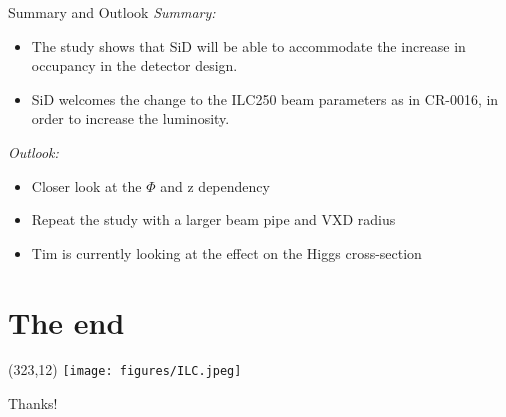\documentclass[xcolor={dvipsnames}]{beamer}
\newcommand{\ilclogo}{
  \setlength{\TPHorizModule}{1pt}
  \setlength{\TPVertModule}{1pt}
  \begin{textblock}{1}(323,12)
   \texttt{[image: figures/ILC.jpeg]}
  \end{textblock}
}
\begin{document}
\begin{frame}{Summary and Outlook}
 \textit{Summary:}
 \begin{itemize}
  \item The study shows that SiD will be able to accommodate the increase in occupancy in the detector design.
  \item \alert{SiD welcomes the change to the ILC250 beam parameters as in CR-0016, in order to increase the luminosity.}
 \end{itemize}
 \vspace*{0.5cm}
 \textit{Outlook:}
  \begin{itemize}
   \item Closer look at the $\Phi$ and z dependency
   \item Repeat the study with a larger beam pipe and VXD radius
   \vspace*{0.2cm}
   \item Tim is currently looking at the effect on the Higgs cross-section
  \end{itemize}

\end{frame}




\section*{The end}
{
\begin{frame}
\ilclogo
\begin{center}
\textcolor{RubineRed}{
	\LARGE Thanks!\\
}
\end{center}
\end{frame}
}
\end{document}
